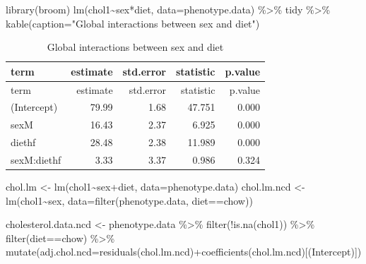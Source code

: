 \documentclass[
]{article}
\newenvironment{Shaded}{\begin{snugshade}}{\end{snugshade}}
\newcommand{\AttributeTok}[1]{\textcolor[rgb]{0.77,0.63,0.00}{#1}}
\newcommand{\FunctionTok}[1]{\textcolor[rgb]{0.00,0.00,0.00}{#1}}
\newcommand{\NormalTok}[1]{#1}
\newcommand{\OtherTok}[1]{\textcolor[rgb]{0.56,0.35,0.01}{#1}}
\newcommand{\SpecialCharTok}[1]{\textcolor[rgb]{0.00,0.00,0.00}{#1}}
\newcommand{\StringTok}[1]{\textcolor[rgb]{0.31,0.60,0.02}{#1}}
\begin{document}
\begin{Shaded}
\begin{Highlighting}[]
\FunctionTok{library}\NormalTok{(broom)}
\FunctionTok{lm}\NormalTok{(chol1}\SpecialCharTok{\textasciitilde{}}\NormalTok{sex}\SpecialCharTok{*}\NormalTok{diet, }\AttributeTok{data=}\NormalTok{phenotype.data) }\SpecialCharTok{\%\textgreater{}\%}
\NormalTok{  tidy }\SpecialCharTok{\%\textgreater{}\%}
  \FunctionTok{kable}\NormalTok{(}\AttributeTok{caption=}\StringTok{"Global interactions between sex and diet"}\NormalTok{)}
\end{Highlighting}
\end{Shaded}

\begin{longtable}[]{@{}lrrrr@{}}
\caption{Global interactions between sex and diet}\tabularnewline
\toprule()
term & estimate & std.error & statistic & p.value \\
\midrule()
\endfirsthead
\toprule()
term & estimate & std.error & statistic & p.value \\
\midrule()
\endhead
(Intercept) & 79.99 & 1.68 & 47.751 & 0.000 \\
sexM & 16.43 & 2.37 & 6.925 & 0.000 \\
diethf & 28.48 & 2.38 & 11.989 & 0.000 \\
sexM:diethf & 3.33 & 3.37 & 0.986 & 0.324 \\
\bottomrule()
\end{longtable}

\begin{Shaded}
\begin{Highlighting}[]
\NormalTok{chol.lm }\OtherTok{\textless{}{-}} \FunctionTok{lm}\NormalTok{(chol1}\SpecialCharTok{\textasciitilde{}}\NormalTok{sex}\SpecialCharTok{+}\NormalTok{diet, }\AttributeTok{data=}\NormalTok{phenotype.data)}
\NormalTok{chol.lm.ncd }\OtherTok{\textless{}{-}} \FunctionTok{lm}\NormalTok{(chol1}\SpecialCharTok{\textasciitilde{}}\NormalTok{sex, }\AttributeTok{data=}\FunctionTok{filter}\NormalTok{(phenotype.data, diet}\SpecialCharTok{==}\StringTok{\textquotesingle{}chow\textquotesingle{}}\NormalTok{))}

\NormalTok{cholesterol.data.ncd }\OtherTok{\textless{}{-}}
\NormalTok{  phenotype.data }\SpecialCharTok{\%\textgreater{}\%}
  \FunctionTok{filter}\NormalTok{(}\SpecialCharTok{!}\FunctionTok{is.na}\NormalTok{(chol1)) }\SpecialCharTok{\%\textgreater{}\%}
  \FunctionTok{filter}\NormalTok{(diet}\SpecialCharTok{==}\StringTok{\textquotesingle{}chow\textquotesingle{}}\NormalTok{) }\SpecialCharTok{\%\textgreater{}\%}
  \FunctionTok{mutate}\NormalTok{(}\AttributeTok{adj.chol.ncd=}\FunctionTok{residuals}\NormalTok{(chol.lm.ncd)}\SpecialCharTok{+}\FunctionTok{coefficients}\NormalTok{(chol.lm.ncd)[}\StringTok{\textquotesingle{}(Intercept)\textquotesingle{}}\NormalTok{])}
\end{Highlighting}
\end{Shaded}
\end{document}
